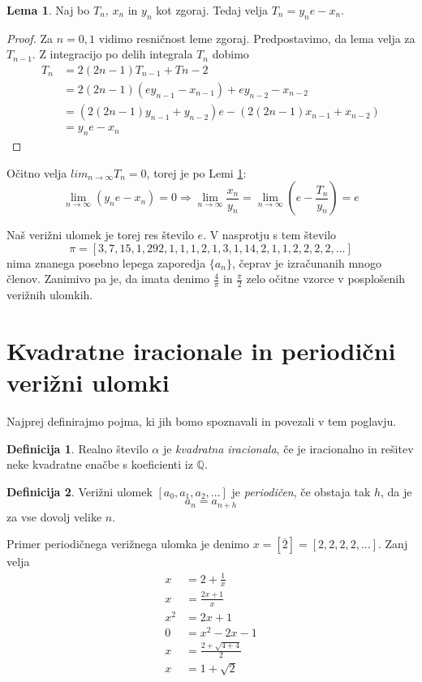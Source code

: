 \documentclass[a4paper,12pt]{article}
\newcommand{\Q}{\mathbb{Q}}
\theoremstyle{definition}
\newtheorem{df}{Definicija}[section]
\theoremstyle{proposition}
\theoremstyle{theorem}
\theoremstyle{lemma}
\newtheorem{lem}{Lema}[section]
\begin{document}
\begin{lem}
\label{rekurzija}
Naj bo $T_n$, $x_n$ in $y_n$ kot zgoraj. Tedaj velja $T_n=y_n e-x_n$.
\end{lem}
\begin{proof}
Za $n=0,1$ vidimo resničnost leme zgoraj. Predpostavimo, da lema velja za $T_{n-1}$. Z integracijo po delih integrala $T_n$ dobimo 
\begin{equation*}
\begin{split}
T_n &= 2(2n-1)T_{n-1}+T{n-2} \\
&=2(2n-1)(e y_{n-1} -x_{n-1}) + e y_{n-2} -x_{n-2} \\
&=(2(2n-1)y_{n-1}+y_{n-2})e - (2(2n-1)x_{n-1}+x_{n-2}) \\
&=y_n e - x_n
\end{split}
\end{equation*}
\end{proof}

Očitno velja $lim_{n\to\infty}T_n =0$, torej je po Lemi \ref{rekurzija}:
\[ \lim_{n\to\infty}(y_ne-x_n) = 0 \Rightarrow \lim_{n\to\infty}\frac{x_n}{y_n}=\lim_{n\to\infty}(e-\frac{T_n}{y_n}) =e \]

Naš verižni ulomek je torej res število $e$. V nasprotju s tem število
$$\pi=[3, 7, 15, 1, 292, 1, 1, 1, 2, 1, 3, 1, 14, 2, 1, 1, 2, 2, 2, 2, ...]$$
nima znanega posebno lepega zaporedja $\{a_n\}$, čeprav je izračunanih mnogo členov. Zanimivo pa je, da imata denimo $\frac{4}{\pi}$ in $\frac{\pi}{2}$ zelo očitne vzorce v posplošenih verižnih ulomkih.

\section{Kvadratne iracionale in periodični verižni ulomki} \label{periode}

Najprej definirajmo pojma, ki jih bomo spoznavali in povezali v tem poglavju.

\begin{df}
Realno število $\alpha$ je \textit{kvadratna iracionala}, če je iracionalno in rešitev neke kvadratne enačbe s koeficienti iz $\Q$.
\end{df}
\begin{df}
Verižni ulomek $[a_0, a_1, a_2, ...]$ je \textit{periodičen}, če obstaja tak $h$, da je $$a_n=a_{n+h}$$ za vse dovolj velike $n$.
\end{df}

Primer periodičnega verižnega ulomka je denimo $x = [\overline{2}] =[2,2,2,2,...]$. Zanj velja
\begin{align*}
x&= 2 + \frac{1}{x} \\
x&= \frac{2x+1}{x} \\
x^2&= 2x+1 \\
0&=x^2-2x-1\\
x&=\frac{2+\sqrt{4+4}}{2}\\
x&=1+\sqrt{2}
\end{align*}
\end{document}
